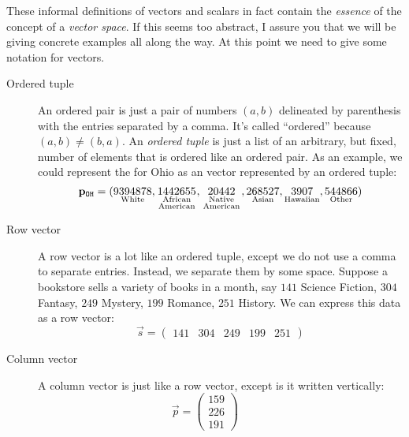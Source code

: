 \documentclass{ximera}
\begin{document}
These informal definitions of vectors and scalars in fact contain the
\textit{essence} of the concept of a \textit{vector space}. If this
seems too abstract, I assure you that we will be giving concrete
examples all along the way. At this point we need to give some
notation for vectors.

\begin{concept}
\begin{description}
\item[Ordered tuple] An ordered pair is just a pair of numbers
  $(a,b)$ delineated by parenthesis with the entries separated by a
  comma. It's called ``ordered'' because $(a,b) \ne (b,a)$. An \textit{ordered
  tuple} is just a list of an arbitrary, but fixed, number of elements
  that is ordered like an ordered pair. As an example, we could
  represent the  for Ohio as an vector
  represented by an ordered tuple:
  \[
  \vec{p}_{\texttt{OH}} = (\underset{\text{White}}{9394878},\underset{\begin{smallmatrix}\text{\scriptsize African}\\ \text{\scriptsize American}\end{smallmatrix}}{1442655},\underset{\begin{smallmatrix}\text{\scriptsize Native}\\\text{\scriptsize American}\end{smallmatrix}}{20442},\underset{\text{Asian}}{268527},\underset{\text{Hawaiian}}{3907},\underset{\text{Other}}{544866})
  \]
\item[Row vector] A row vector is a lot like an ordered tuple, except
  we do not use a comma to separate entries. Instead, we separate them
  by some space.  Suppose a bookstore sells a variety of books in a
  month, say $141$ Science Fiction, $304$ Fantasy, $249$ Mystery,
  $199$ Romance, $251$ History.  We can express this
  data as a row vector:
  \[
  \vec{s} = \begin{pmatrix}141 & 304 & 249 & 199 & 251 \end{pmatrix}
  \]
  \item[Column vector] A column vector is just like a row vector,
  except is it written vertically:
  \[
  \vec{p} = \begin{pmatrix}
    159\\  226 \\ 191\end{pmatrix}
    \qquad
    \begin{array}{l}

\end{array}\]
\end{description}
\end{concept}
\end{document}
